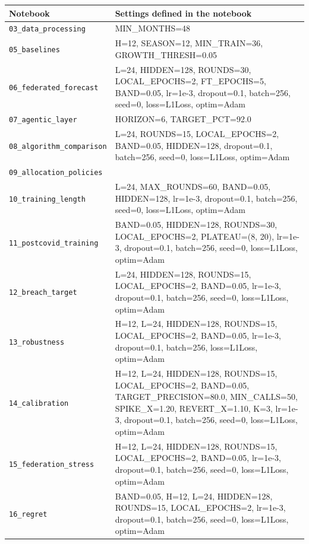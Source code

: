 \documentclass[11pt,a4paper]{article}
\begin{document}
\begin{center}
\scriptsize
\begin{tabular}{@{}lp{11.2cm}@{}}
\toprule
\textbf{Notebook} & \textbf{Settings defined in the notebook} \\
\midrule
\texttt{03\_data\_processing} & MIN\_MONTHS=48 \\
\texttt{05\_baselines} & H=12, SEASON=12, MIN\_TRAIN=36, GROWTH\_THRESH=0.05 \\
\texttt{06\_federated\_forecast} & L=24, HIDDEN=128, ROUNDS=30, LOCAL\_EPOCHS=2, FT\_EPOCHS=5, BAND=0.05, lr=1e-3, dropout=0.1, batch=256, seed=0, loss=L1Loss, optim=Adam \\
\texttt{07\_agentic\_layer} & HORIZON=6, TARGET\_PCT=92.0 \\
\texttt{08\_algorithm\_comparison} & L=24, ROUNDS=15, LOCAL\_EPOCHS=2, BAND=0.05, HIDDEN=128, dropout=0.1, batch=256, seed=0, loss=L1Loss, optim=Adam \\
\texttt{09\_allocation\_policies} &  \\
\texttt{10\_training\_length} & L=24, MAX\_ROUNDS=60, BAND=0.05, HIDDEN=128, lr=1e-3, dropout=0.1, batch=256, seed=0, loss=L1Loss, optim=Adam \\
\texttt{11\_postcovid\_training} & BAND=0.05, HIDDEN=128, ROUNDS=30, LOCAL\_EPOCHS=2, PLATEAU=(8, 20), lr=1e-3, dropout=0.1, batch=256, seed=0, loss=L1Loss, optim=Adam \\
\texttt{12\_breach\_target} & L=24, HIDDEN=128, ROUNDS=15, LOCAL\_EPOCHS=2, BAND=0.05, lr=1e-3, dropout=0.1, batch=256, seed=0, loss=L1Loss, optim=Adam \\
\texttt{13\_robustness} & H=12, L=24, HIDDEN=128, ROUNDS=15, LOCAL\_EPOCHS=2, BAND=0.05, lr=1e-3, dropout=0.1, batch=256, loss=L1Loss, optim=Adam \\
\texttt{14\_calibration} & H=12, L=24, HIDDEN=128, ROUNDS=15, LOCAL\_EPOCHS=2, BAND=0.05, TARGET\_PRECISION=80.0, MIN\_CALLS=50, SPIKE\_X=1.20, REVERT\_X=1.10, K=3, lr=1e-3, dropout=0.1, batch=256, seed=0, loss=L1Loss, optim=Adam \\
\texttt{15\_federation\_stress} & H=12, L=24, HIDDEN=128, ROUNDS=15, LOCAL\_EPOCHS=2, BAND=0.05, lr=1e-3, dropout=0.1, batch=256, seed=0, loss=L1Loss, optim=Adam \\
\texttt{16\_regret} & BAND=0.05, H=12, L=24, HIDDEN=128, ROUNDS=15, LOCAL\_EPOCHS=2, lr=1e-3, dropout=0.1, batch=256, seed=0, loss=L1Loss, optim=Adam \\
\bottomrule
\end{tabular}
\end{center}
\end{document}
